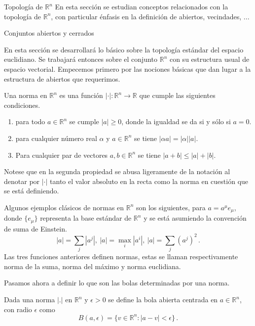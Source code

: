 \begin{chapter}{Topología de $\mathbb{R}^n$}
En esta sección se estudian conceptos relacionados con la topología de $\mathbb{R}^n$, con particular énfasis en la definición de abiertos, vecindades, ...

\begin{section}{Conjuntos abiertos y cerrados}

En esta sección se desarrollará lo básico sobre la topología estándar del espacio euclidiano. Se trabajará entonces sobre el conjunto $\mathbb{R}^n$ con su estructura usual de espacio vectorial. Empecemos primero por las nociones básicas que dan lugar a la estructura de abiertos que requerimos.

\begin{defn}

Una norma en $\mathbb{R}^n$ es una función $|\cdot|: \mathbb{R}^n \to \mathbb{R}$ que cumple las siguientes condiciones.

\begin{enumerate}
    \item para todo $a\in \mathbb{R}^n$ se cumple $|a| \geq 0$, donde la igualdad se da si y sólo si $a = 0$.
    \item para cualquier número real $\alpha$ y $a \in \mathbb{R}^n$ se tiene $|\alpha a| = |\alpha| |a|$.
    \item Para cualquier par de vectores $a,b \in \mathbb{R}^n$ se tiene $|a+b| \leq |a| + |b|$.
\end{enumerate}

\end{defn}

Notese que en la segunda propiedad se abusa ligeramente de la notación al denotar por $|\cdot|$ tanto el valor absoluto en la recta como la norma en cuestión que se está definiendo.  

Algunos ejemplos clásicos de normas en $\mathbb{R}^n$ son los siguientes, para $a = a^{\mu} e_{\mu}$, donde $\{ e_{\mu} \}$ representa la base estándar de $\mathbb{R}^n$ y se está asumiendo la convención de suma de Einstein.
$$|a| = \sum_{j} |a^{j}|, \ |a| = \max_{i} |a^i|, \ |a| = \sum_j (a^j)^2\,.$$
Las tres funciones anteriores definen normas, estas se llaman respectivamente norma de la suma, norma del máximo y norma euclidiana. 

Pasamos ahora a definir lo que son las bolas determinadas por una norma.

\begin{defn}

Dada una norma $|.|$ en $\mathbb{R}^n$ y $\epsilon > 0$ se define la bola abierta centrada en $a \in \mathbb{R}^n$, con radio $\epsilon$ como
$$B(a,\epsilon) = \{ v \in \mathbb{R}^n : |a - v|< \epsilon  \}\,.$$


\end{defn}
\end{section}
\end{chapter}
